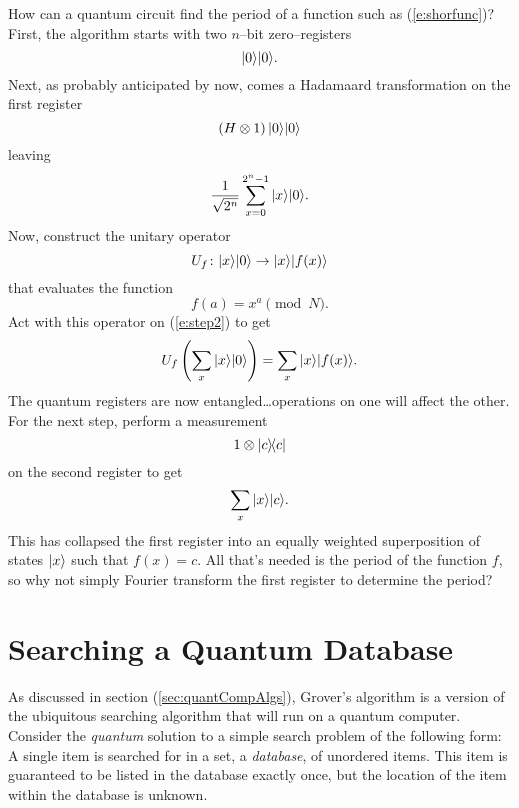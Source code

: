 How can a quantum circuit find the period of a function
such as (\ref{e:shorfunc})?  First, the algorithm starts
with two $n$--bit zero--registers
\begin{equation}
{|{0}\rangle}{|{0}\rangle}.
\end{equation}
Next, as probably anticipated by now, comes a Hadamaard
transformation on the first register 
\begin{equation}
\left( H\otimes 1 \right) {|{0}\rangle}{|{0}\rangle}
\end{equation}
leaving
\begin{equation}
\frac{1}{\sqrt{2^n}}\sum_{x=0}^{2^n-1} {|{x}\rangle}{|{0}\rangle}.
\label{e:step2}
\end{equation}
Now, construct the unitary operator
\begin{equation}
U_f\colon{|{x}\rangle}{|{0}\rangle}\to{|{x}\rangle}{|{f(x)}\rangle}
\end{equation}
that evaluates the function
\begin{equation}
f(a) = x^a\pmod{N}.
\end{equation}
Act with this operator on (\ref{e:step2}) to get
\begin{equation}
U_f \left( \sum_{x} {|{x}\rangle}{|{0}\rangle} \right)
= \sum_{x} {|{x}\rangle}{|{f(x)}\rangle}.
\end{equation}
The quantum registers are now entangled\dots operations on
one will affect the other.  For the next step, 
perform a measurement 
\begin{equation}
1\otimes {|{c}\rangle\!\langle{c}|}
\end{equation}
on the second register to get
\begin{equation}
\sum_x {|{x}\rangle}{|{c}\rangle}.
\end{equation}
This has collapsed the first register into an equally weighted
superposition of states ${|{x}\rangle}$ such that 
$f(x) = c$.  All that's needed is the period of the function
$f$, so why not simply Fourier transform the first register
to determine the period?



\section{Searching a Quantum Database}
\label{sec:grover}

As discussed in section (\ref{sec:quantCompAlgs}), Grover's algorithm is
a version of the ubiquitous searching algorithm that will run on a quantum
computer.  Consider the {\sl quantum} solution to a simple search problem of 
the following form: A
single item is searched for in a set, a \emph{database}, of unordered items.  
This item is guaranteed to be listed in the database exactly once, but 
the location of the item within the database is unknown.

